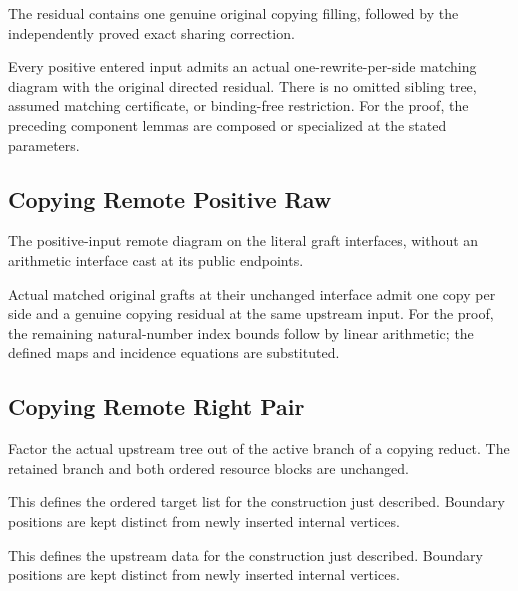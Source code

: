 The residual contains one genuine original copying filling, followed by the independently proved exact sharing correction.
\par{}

Every positive entered input admits an actual one-rewrite-per-side matching diagram with the original directed residual. There is no omitted sibling tree, assumed matching certificate, or binding-free restriction.
For the proof, the preceding component lemmas are composed or specialized at the stated parameters.
\par{}

\subsection{Copying Remote Positive Raw}
The positive-input remote diagram on the literal graft interfaces, without an arithmetic interface cast at its public endpoints.

Actual matched original grafts at their unchanged interface admit one copy per side and a genuine copying residual at the same upstream input.
For the proof, the remaining natural-number index bounds follow by linear arithmetic; the defined maps and incidence equations are substituted.
\par{}

\subsection{Copying Remote Right Pair}
Factor the actual upstream tree out of the active branch of a copying reduct. The retained branch and both ordered resource blocks are unchanged.

This defines the ordered target list for the construction just described. Boundary positions are kept distinct from newly inserted internal vertices.
\par{}

This defines the upstream data for the construction just described. Boundary positions are kept distinct from newly inserted internal vertices.
\par{}

